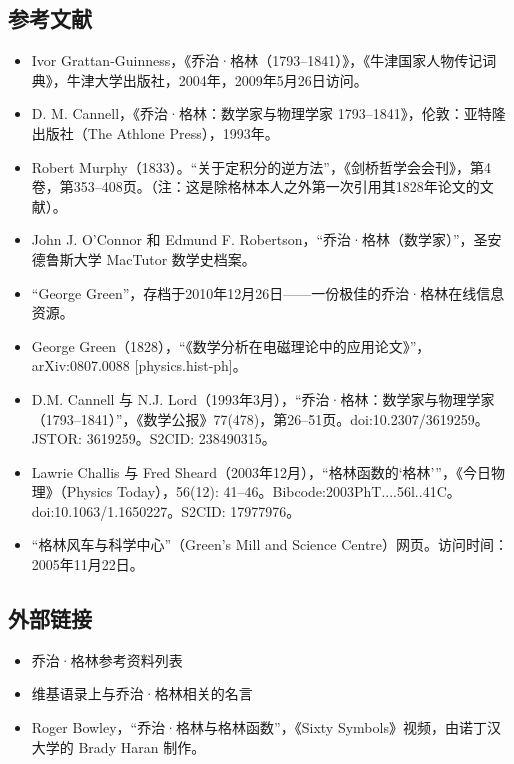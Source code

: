 \subsection{参考文献}
\begin{itemize}
\item Ivor Grattan-Guinness，《乔治·格林（1793–1841）》，《牛津国家人物传记词典》，牛津大学出版社，2004年，2009年5月26日访问。
\item D. M. Cannell，《乔治·格林：数学家与物理学家 1793–1841》，伦敦：亚特隆出版社（The Athlone Press），1993年。
\item Robert Murphy（1833）。“关于定积分的逆方法”，《剑桥哲学会会刊》，第4卷，第353–408页。（注：这是除格林本人之外第一次引用其1828年论文的文献）。
\item John J. O'Connor 和 Edmund F. Robertson，“乔治·格林（数学家）”，圣安德鲁斯大学 MacTutor 数学史档案。
\item “George Green”，存档于2010年12月26日——一份极佳的乔治·格林在线信息资源。
\item George Green（1828），“《数学分析在电磁理论中的应用论文》”，arXiv:0807.0088 [physics.hist-ph]。
\item D.M. Cannell 与 N.J. Lord（1993年3月），“乔治·格林：数学家与物理学家（1793–1841）”，《数学公报》77(478)，第26–51页。doi:10.2307/3619259。JSTOR: 3619259。S2CID: 238490315。
\item Lawrie Challis 与 Fred Sheard（2003年12月），“格林函数的‘格林’”，《今日物理》（Physics Today），56(12): 41–46。Bibcode:2003PhT....56l..41C。doi:10.1063/1.1650227。S2CID: 17977976。
\item “格林风车与科学中心”（Green's Mill and Science Centre）网页。访问时间：2005年11月22日。
\end{itemize}

\subsection{外部链接}
\begin{itemize}
\item 乔治·格林参考资料列表
\item 维基语录上与乔治·格林相关的名言
\item Roger Bowley，“乔治·格林与格林函数”，《Sixty Symbols》视频，由诺丁汉大学的 Brady Haran 制作。
\end{itemize}
